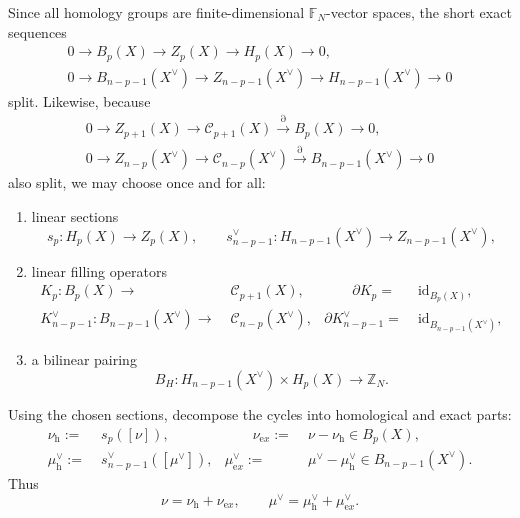 Since all homology groups are finite-dimensional \(\mathbb F_N\)-vector spaces, the short
exact sequences
\begin{equation}\begin{gathered}
		0\to B_p(X)\to Z_p(X)\to H_p(X)\to 0,
		\\
		0\to B_{n-p-1}(X^\vee)\to Z_{n-p-1}(X^\vee)\to H_{n-p-1}(X^\vee)\to 0
\end{gathered}\end{equation}
split. Likewise, because
\begin{equation}\begin{gathered}
		0\to Z_{p+1}(X)\to \mathcal C_{p+1}(X)\xrightarrow{\partial} B_p(X)\to 0,
		\\
		0\to Z_{n-p}(X^\vee)\to \mathcal C_{n-p}(X^\vee)\xrightarrow{\partial} B_{n-p-1}(X^\vee)\to 0
\end{gathered}\end{equation}
also split, we may choose once and for all:
\begin{enumerate}
	\item linear sections
	\begin{equation}
		s_p:H_p(X)\rightarrow Z_p(X),
		\qquad
		s^\vee_{n-p-1}:H_{n-p-1}(X^\vee)\rightarrow Z_{n-p-1}(X^\vee),
		\label{eq:sections}
	\end{equation}
	\item linear filling operators
	\begin{align}
		K_p:B_p(X)\rightarrow&\; \mathcal C_{p+1}(X),
		&\qquad
		\partial K_p=&\;\mathrm{id}_{B_p(X)},
		\label{eq:Kp}
	\\
		K^\vee_{n-p-1}:B_{n-p-1}(X^\vee)\rightarrow&\; \mathcal C_{n-p}(X^\vee),
		&
		\partial K^\vee_{n-p-1}=&\;\mathrm{id}_{B_{n-p-1}(X^\vee)},
		\label{eq:Kdual}
	\end{align}
	\item a bilinear pairing
	\begin{equation}
		B_H:H_{n-p-1}(X^\vee)\times H_p(X)\rightarrow \mathbb Z_N.
		\label{eq:BH}
	\end{equation}
\end{enumerate}

Using the chosen sections, decompose the cycles into homological and exact parts:
\begin{equation}
\begin{aligned}
	\nu_{\mathrm h}:=&\;s_p([\nu]),
	&\qquad
	\nu_{\mathrm ex}:=&\;\nu-\nu_{\mathrm h}\in B_p(X),
	\\
	\mu^\vee_{\mathrm h}:=&\;s^\vee_{n-p-1}([\mu^\vee]),
	&
	\mu^\vee_{\mathrm ex}:=&\;\mu^\vee-\mu^\vee_{\mathrm h}\in B_{n-p-1}(X^\vee).
\end{aligned}
\end{equation}
Thus
\begin{equation}
	\nu=\nu_{\mathrm h}+\nu_{\mathrm ex},
	\qquad
	\mu^\vee=\mu^\vee_{\mathrm h}+\mu^\vee_{\mathrm ex}.
	\label{eq:total-decomp}
\end{equation}

